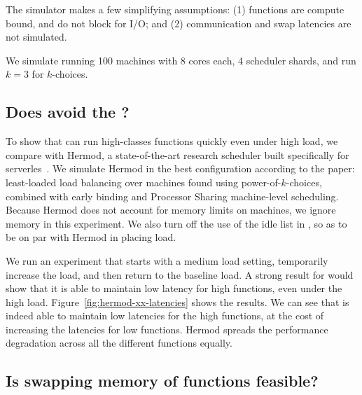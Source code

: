 The simulator makes a few simplifying assumptions: (1) functions are
compute bound, and do not block for I/O; and (2) communication and
swap latencies are not simulated.

We simulate running 100 machines with 8 cores each, 4 scheduler
shards, and run $k=3$ for $k$-choices.

\subsection{Does \sys{} avoid the \problem{}?}
\label{s:hermod}
  
To show that \sys{} can run high-classes functions quickly even under
high load, we compare \sys{} with Hermod, a state-of-the-art research
scheduler built specifically for serverles~\cite{hermod}. We simulate
Hermod in the best configuration according to the paper: least-loaded
load balancing over machines found using power-of-$k$-choices,
combined with early binding and Processor Sharing machine-level
scheduling. Because Hermod does not account for memory limits on
machines, we ignore memory in this experiment.  We also turn off the
use of the idle list in \sys{}, so as to be on par with Hermod in
placing load.

We run an experiment that starts with a medium load setting,
temporarily increase the load, and then return to the baseline load. A
strong result for \sys{} would show that it is able to maintain low
latency for high \priceclass{} functions, even under the high load.
Figure~\ref{fig:hermod-xx-latencies} shows the results. We can see
that \sys{} is indeed able to maintain low latencies for the high
\class{} functions, at the cost of increasing the latencies for low
\class{} functions. Hermod spreads the performance degradation across
all the different functions equally.

\subsection{Is swapping memory of functions feasible?}
\label{s:memory}
  
